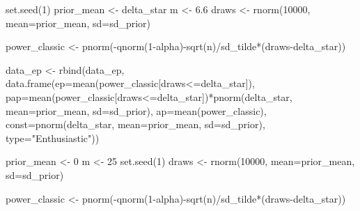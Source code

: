 \documentclass[
]{book}
\newenvironment{Shaded}{\begin{snugshade}}{\end{snugshade}}
\newcommand{\AttributeTok}[1]{\textcolor[rgb]{0.77,0.63,0.00}{#1}}
\newcommand{\DecValTok}[1]{\textcolor[rgb]{0.00,0.00,0.81}{#1}}
\newcommand{\FloatTok}[1]{\textcolor[rgb]{0.00,0.00,0.81}{#1}}
\newcommand{\FunctionTok}[1]{\textcolor[rgb]{0.00,0.00,0.00}{#1}}
\newcommand{\NormalTok}[1]{#1}
\newcommand{\OtherTok}[1]{\textcolor[rgb]{0.56,0.35,0.01}{#1}}
\newcommand{\SpecialCharTok}[1]{\textcolor[rgb]{0.00,0.00,0.00}{#1}}
\newcommand{\StringTok}[1]{\textcolor[rgb]{0.31,0.60,0.02}{#1}}
\begin{document}
\begin{Shaded}
\begin{Highlighting}[]
\FunctionTok{set.seed}\NormalTok{(}\DecValTok{1}\NormalTok{)}
\NormalTok{prior\_mean }\OtherTok{\textless{}{-}}\NormalTok{ delta\_star}
\NormalTok{m }\OtherTok{\textless{}{-}} \FloatTok{6.6}
\NormalTok{draws }\OtherTok{\textless{}{-}} \FunctionTok{rnorm}\NormalTok{(}\DecValTok{10000}\NormalTok{, }\AttributeTok{mean=}\NormalTok{prior\_mean, }\AttributeTok{sd=}\NormalTok{sd\_prior)}

\NormalTok{power\_classic }\OtherTok{\textless{}{-}} \FunctionTok{pnorm}\NormalTok{(}\SpecialCharTok{{-}}\FunctionTok{qnorm}\NormalTok{(}\DecValTok{1}\SpecialCharTok{{-}}\NormalTok{alpha)}\SpecialCharTok{{-}}\FunctionTok{sqrt}\NormalTok{(n)}\SpecialCharTok{/}\NormalTok{sd\_tilde}\SpecialCharTok{*}\NormalTok{(draws}\SpecialCharTok{{-}}\NormalTok{delta\_star))}

\NormalTok{data\_ep }\OtherTok{\textless{}{-}} \FunctionTok{rbind}\NormalTok{(data\_ep, }\FunctionTok{data.frame}\NormalTok{(}\AttributeTok{ep=}\FunctionTok{mean}\NormalTok{(power\_classic[draws}\SpecialCharTok{\textless{}=}\NormalTok{delta\_star]), }\AttributeTok{pap=}\FunctionTok{mean}\NormalTok{(power\_classic[draws}\SpecialCharTok{\textless{}=}\NormalTok{delta\_star])}\SpecialCharTok{*}\FunctionTok{pnorm}\NormalTok{(delta\_star, }\AttributeTok{mean=}\NormalTok{prior\_mean, }\AttributeTok{sd=}\NormalTok{sd\_prior), }\AttributeTok{ap=}\FunctionTok{mean}\NormalTok{(power\_classic), }\AttributeTok{const=}\FunctionTok{pnorm}\NormalTok{(delta\_star, }\AttributeTok{mean=}\NormalTok{prior\_mean, }\AttributeTok{sd=}\NormalTok{sd\_prior), }\AttributeTok{type=}\StringTok{"Enthusiastic"}\NormalTok{))}


\NormalTok{prior\_mean }\OtherTok{\textless{}{-}} \DecValTok{0}
\NormalTok{m }\OtherTok{\textless{}{-}} \DecValTok{25}
\FunctionTok{set.seed}\NormalTok{(}\DecValTok{1}\NormalTok{)}
\NormalTok{draws }\OtherTok{\textless{}{-}} \FunctionTok{rnorm}\NormalTok{(}\DecValTok{10000}\NormalTok{, }\AttributeTok{mean=}\NormalTok{prior\_mean, }\AttributeTok{sd=}\NormalTok{sd\_prior)}

\NormalTok{power\_classic }\OtherTok{\textless{}{-}} \FunctionTok{pnorm}\NormalTok{(}\SpecialCharTok{{-}}\FunctionTok{qnorm}\NormalTok{(}\DecValTok{1}\SpecialCharTok{{-}}\NormalTok{alpha)}\SpecialCharTok{{-}}\FunctionTok{sqrt}\NormalTok{(n)}\SpecialCharTok{/}\NormalTok{sd\_tilde}\SpecialCharTok{*}\NormalTok{(draws}\SpecialCharTok{{-}}\NormalTok{delta\_star))}


\end{Highlighting}
\end{Shaded}
\end{document}
